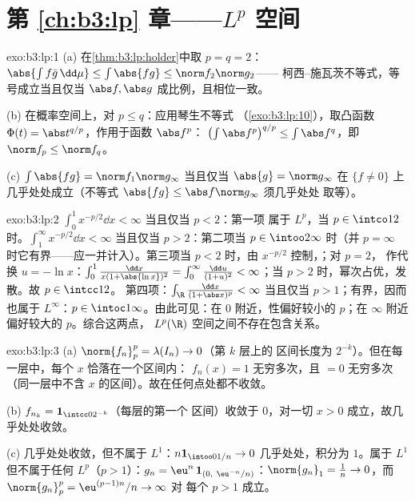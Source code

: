 \section*{第 \ref{ch:b3:lp} 章——$L^p$ 空间}

\begin{solution}{exo:b3:lp:1}
(a) 在\cref{thm:b3:lp:holder}中取 $p = q = 2$：$\abs{\int f\bar
g\,\dd\mu} \leq \int\abs{fg} \leq \norm f_2\norm g_2$——
柯西--施瓦茨不等式，等号成立当且仅当 $\abs f, \abs g$
成比例，且相位一致。

(b) 在概率空间上，对 $p \leq q$：应用琴生不等式
（\cref{exo:b3:lp:10}），取凸函数 $\Phi(t) =
\abs t^{q/p}$，作用于函数 $\abs f^p$：
$\bigl(\int\abs f^p\bigr)^{q/p} \leq \int\abs f^q$，即
$\norm f_p \leq \norm f_q$。

(c) $\int\abs{fg} = \norm f_1\norm g_\infty$ 当且仅当 $\abs{g} =
\norm g_\infty$ 在 $\{f \neq 0\}$ 上几乎处处成立（不等式
$\abs{fg} \leq \abs f\norm g_\infty$ 须几乎处处
取等）。
\end{solution}

\begin{solution}{exo:b3:lp:2}
$\int_0^1 x^{-p/2}\dd x < \infty$ 当且仅当 $p < 2$：第一项
属于 $L^p$，当 $p \in \intco12$ 时。$\int_1^\infty x^{-p/2}\dd x <
\infty$ 当且仅当 $p > 2$：第二项当 $p \in \intoo2\infty$ 时（并
$p = \infty$ 时它有界——应一并计入）。第三项当 $p <
2$ 时，由 $x^{-p/2}$ 控制，；对 $p = 2$，
作代换 $u = -\ln x$：$\int_0^1\frac{\dd x}{x(1 + \abs{\ln
x})^2} = \int_0^\infty\frac{\dd u}{(1 + u)^2} < \infty$；当
$p > 2$ 时，幂次占优，发散。故 $p \in \intcc12$。
第四项：$\int_\R\frac{\dd x}{(1 + \abs x)^p} < \infty$ 当且仅当 $p >
1$；有界，因而也属于 $L^\infty$：$p \in
\intoc1\infty$。由此可见：在 $0$ 附近，性偏好较小的 $p$；在
$\infty$ 附近偏好较大的 $p$。综合这两点，
$L^p(\R)$ 空间之间不存在包含关系。
\end{solution}

\begin{solution}{exo:b3:lp:3}
(a) $\norm{f_n}_p^p = \lambda(I_n) \to 0$（第 $k$ 层上的
区间长度为 $2^{-k}$）。但在每一层中，每个 $x$ 恰落在一个区间内：
$f_n(x) = 1$ 无穷多次，且 $= 0$
无穷多次（同一层中不含
$x$ 的区间）。故在任何点处都不收敛。

(b) $f_{n_k} = \mathbf 1_{\intcc0{2^{-k}}}$（每层的第一个
区间）收敛于 $0$，对一切 $x > 0$ 成立，故几乎处处收敛。

(c) 几乎处处收敛，但不属于 $L^1$：$n\mathbf 1_{\intoo0{1/n}} \to 0$
几乎处处，积分为 $1$。属于 $L^1$ 但不属于任何 $L^p$（$p > 1$）：$g_n =
\eu^n\,\mathbf 1_{(0,\ \eu^{-n}/n)}$：$\norm{g_n}_1 = \frac1n
\to 0$，而 $\norm{g_n}_p^p = \eu^{(p-1)n}/n \to \infty$ 对
每个 $p > 1$ 成立。
\end{solution}

